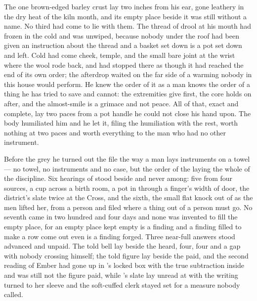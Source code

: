 The one brown-edged barley crust lay two inches from his ear, gone leathery in the dry heat of the kiln month, and its empty place beside it was still without a name. No third had come to lie with them. The thread of drool at his mouth had frozen in the cold and was unwiped, because nobody under the roof had been given an instruction about the thread and a basket set down is a pot set down and left. Cold had come cheek, temple, and the small bare joint at the wrist where the wool rode back, and had stopped there as though it had reached the end of its own order; the afterdrop waited on the far side of a warming nobody in this house would perform. He knew the order of it as a man knows the order of a thing he has tried to save and cannot: the extremities give first, the core holds on after, and the almost-smile is a grimace and not peace. All of that, exact and complete, lay two paces from a pot handle he could not close his hand upon. The body humiliated him and he let it, filing the humiliation with the rest, worth nothing at two paces and worth everything to the man who had no other instrument.

\scenebreak

Before the grey he turned out the file the way a man lays instruments on a towel --- no towel, no instruments and no case, but the order of the laying the whole of the discipline. Six hearings of  stood beside and never among: five from four sources, a cup across a birth room, a pot in  through a finger's width of door, the district's slate twice at the Cross, and the sixth, the small flat knock out of  as the men lifted her, from a person and filed where a thing out of a person must go. No seventh came in two hundred and four days and none was invented to fill the empty place, for an empty place kept empty is a finding and a finding filled to make a row come out even is a finding forged. Three near-full answers stood advanced and unpaid. The told bell lay beside the heard, four, four and a gap with nobody crossing himself; the told figure lay beside the paid, and the second reading of Ember had gone up  in 's locked box with the true subtraction inside and was still not the figure paid, while 's slate lay unread at  with the writing turned to her sleeve and the soft-cuffed clerk stayed set for a measure nobody called.

